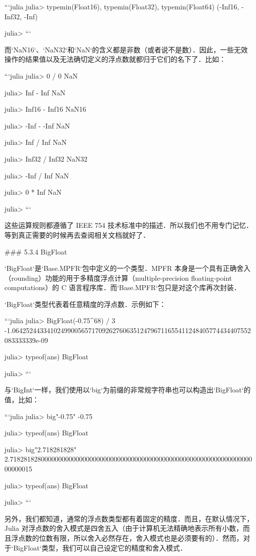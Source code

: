 ```julia
julia> typemin(Float16), typemin(Float32), typemin(Float64)
(-Inf16, -Inf32, -Inf)

julia> 
```

而`NaN16`、`NaN32`和`NaN`的含义都是非数（或者说不是数）．因此，一些无效操作的结果值以及无法确切定义的浮点数就都归于它们的名下了．比如：

```julia
julia> 0 / 0
NaN

julia> Inf - Inf
NaN

julia> Inf16 - Inf16
NaN16

julia> -Inf - -Inf
NaN

julia> Inf / Inf
NaN

julia> Inf32 / Inf32
NaN32

julia> -Inf / Inf
NaN

julia> 0 * Inf
NaN

julia> 
```

这些运算规则都遵循了 IEEE 754 技术标准中的描述．所以我们也不用专门记忆．等到真正需要的时候再去查阅相关文档就好了．

### 5.3.4 BigFloat

`BigFloat`是`Base.MPFR`包中定义的一个类型．MPFR 本身是一个具有正确舍入（rounding）功能的用于多精度浮点计算（multiple-precision floating-point computations）的 C 语言程序库．而`Base.MPFR`包只是对这个库再次封装．

`BigFloat`类型代表着任意精度的浮点数．示例如下：

```julia
julia> BigFloat(-0.75^68) / 3
-1.064252443341024990056571709262760635124796711655411248405774434407552083333339e-09

julia> typeof(ans)
BigFloat

julia> 
```

与`BigInt`一样，我们使用以`big`为前缀的非常规字符串也可以构造出`BigFloat`的值，比如：

```julia
julia> big"-0.75"
-0.75

julia> typeof(ans)
BigFloat

julia> big"2.718281828"
2.718281828000000000000000000000000000000000000000000000000000000000000000000015

julia> typeof(ans)
BigFloat

julia> 
```

另外，我们都知道，通常的浮点数类型都有着固定的精度．而且，在默认情况下，Julia 对浮点数的舍入模式是四舍五入（由于计算机无法精确地表示所有小数，而且浮点数的位数有限，所以舍入必然存在，舍入模式也是必须要有的）．然而，对于`BigFloat`类型，我们可以自己设定它的精度和舍入模式．

